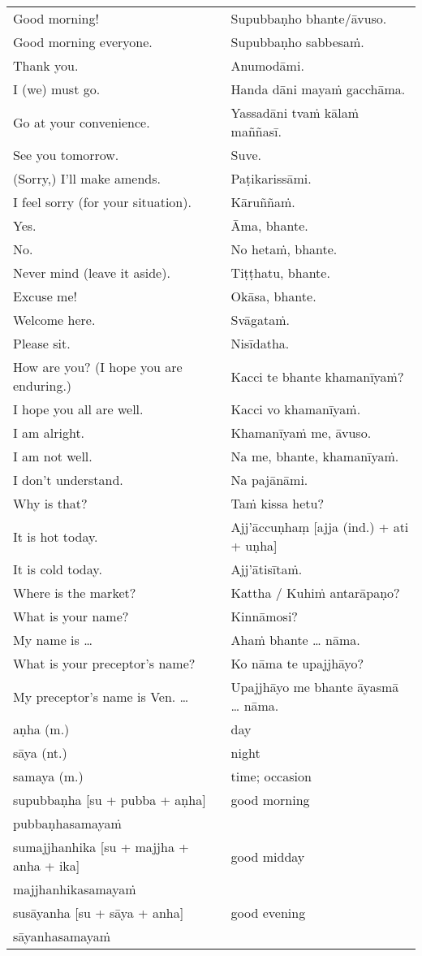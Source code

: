 \documentclass[11pt,oneside]{memoir}
\begin{document}
\begin{center}
\begin{tabular}{ll}
Good morning! & Supubbaṇho bhante/āvuso.\\[0pt]
Good morning everyone. & Supubbaṇho sabbesaṁ.\\[0pt]
Thank you. & Anumodāmi.\\[0pt]
I (we) must go. & Handa dāni mayaṁ gacchāma.\\[0pt]
Go at your convenience. & Yassadāni tvaṁ kālaṁ maññasī.\\[0pt]
See you tomorrow. & Suve.\\[0pt]
(Sorry,) I'll make amends. & Paṭikarissāmi.\\[0pt]
I feel sorry (for your situation). & Kāruññaṁ.\\[0pt]
Yes. & Āma, bhante.\\[0pt]
No. & No hetaṁ, bhante.\\[0pt]
Never mind (leave it aside). & Tiṭṭhatu, bhante.\\[0pt]
Excuse me! & Okāsa, bhante.\\[0pt]
Welcome here. & Svāgataṁ.\\[0pt]
Please sit. & Nisīdatha.\\[0pt]
How are you? (I hope you are enduring.) & Kacci te bhante khamanīyaṁ?\\[0pt]
I hope you all are well. & Kacci vo khamanīyaṁ.\\[0pt]
I am alright. & Khamanīyaṁ me, āvuso.\\[0pt]
I am not well. & Na me, bhante, khamanīyaṁ.\\[0pt]
I don't understand. & Na pajānāmi.\\[0pt]
Why is that? & Taṁ kissa hetu?\\[0pt]
It is hot today. & Ajj'āccuṇhaṃ [ajja (ind.) + ati  + uṇha]\\[0pt]
It is cold today. & Ajj'ātisītaṁ.\\[0pt]
Where is the market? & Kattha / Kuhiṁ antarāpaṇo?\\[0pt]
What is your name? & Kinnāmosi?\\[0pt]
My name is \ldots{} & Ahaṁ bhante \ldots{} nāma.\\[0pt]
What is your preceptor's name? & Ko nāma te upajjhāyo?\\[0pt]
My preceptor's name is Ven. \ldots{} & Upajjhāyo me bhante āyasmā \ldots{} nāma.\\[0pt]
aṇha (m.) & day\\[0pt]
sāya (nt.) & night\\[0pt]
samaya (m.) & time; occasion\\[0pt]
supubbaṇha [su + pubba + aṇha] & good morning\\[0pt]
pubbaṇhasamayaṁ & \\[0pt]
sumajjhanhika [su + majjha + anha + ika] & good midday\\[0pt]
majjhanhikasamayaṁ & \\[0pt]
susāyanha [su + sāya + anha] & good evening\\[0pt]
sāyanhasamayaṁ & \\[0pt]
\end{tabular}
\end{center}
\end{document}
